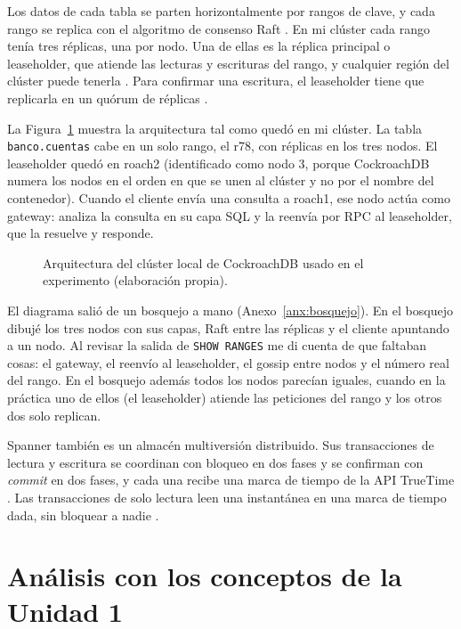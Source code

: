 \documentclass[12pt,a4paper]{article}
\begin{document}
Los datos de cada tabla se parten horizontalmente por rangos de clave, y cada rango se replica con el algoritmo de consenso Raft \cite{pina2023newsql}. En mi clúster cada rango tenía tres réplicas, una por nodo. Una de ellas es la réplica principal o leaseholder, que atiende las lecturas y escrituras del rango, y cualquier región del clúster puede tenerla \cite{ajmani2022demo}. Para confirmar una escritura, el leaseholder tiene que replicarla en un quórum de réplicas \cite{ajmani2022demo}.

La Figura~\ref{fig:arquitectura} muestra la arquitectura tal como quedó en mi clúster. La tabla \texttt{banco.cuentas} cabe en un solo rango, el r78, con réplicas en los tres nodos. El leaseholder quedó en roach2 (identificado como nodo 3, porque CockroachDB numera los nodos en el orden en que se unen al clúster y no por el nombre del contenedor). Cuando el cliente envía una consulta a roach1, ese nodo actúa como gateway: analiza la consulta en su capa SQL y la reenvía por RPC al leaseholder, que la resuelve y responde.

\begin{figure}[H]
  \centering
  \resizebox{\textwidth}{!}{}
  \caption{Arquitectura del clúster local de CockroachDB usado en el experimento (elaboración propia).}
  \label{fig:arquitectura}
\end{figure}

El diagrama salió de un bosquejo a mano (Anexo~\ref{anx:bosquejo}). En el bosquejo dibujé los tres nodos con sus capas, Raft entre las réplicas y el cliente apuntando a un nodo. Al revisar la salida de \texttt{SHOW RANGES} me di cuenta de que faltaban cosas: el gateway, el reenvío al leaseholder, el gossip entre nodos y el número real del rango. En el bosquejo además todos los nodos parecían iguales, cuando en la práctica uno de ellos (el leaseholder) atiende las peticiones del rango y los otros dos solo replican.

Spanner también es un almacén multiversión distribuido. Sus transacciones de lectura y escritura se coordinan con bloqueo en dos fases y se confirman con \emph{commit} en dos fases, y cada una recibe una marca de tiempo de la API TrueTime \cite{song2025k2}. Las transacciones de solo lectura leen una instantánea en una marca de tiempo dada, sin bloquear a nadie \cite{song2025k2}.

\section{Análisis con los conceptos de la Unidad 1}
\end{document}
